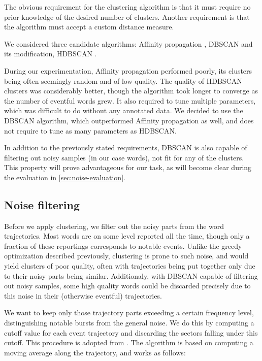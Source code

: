 The obvious requirement for the clustering algorithm is that it must require no prior knowledge of the desired number of clusters. Another requirement is that the algorithm must accept a custom distance measure.

We considered three candidate algorithms: Affinity propagation \citep{affinity-propagation}, DBSCAN \citep{dbscan} and its modification, HDBSCAN \citep{hdbscan}.

During our experimentation, Affinity propagation performed poorly, its clusters being often seemingly random and of low quality. The quality of HDBSCAN clusters was considerably better, though the algorithm took longer to converge as the number of eventful words grew. It also required to tune multiple parameters, which was difficult to do without any annotated data. We decided to use the DBSCAN algorithm, which outperformed Affinity propagation as well, and does not require to tune as many parameters as HDBSCAN.

In addition to the previously stated requirements, DBSCAN is also capable of filtering out noisy samples (in our case words), not fit for any of the clusters. This property will prove advantageous for our task, as will become clear during the evaluation in \autoref{sec:noise-evaluation}.


\subsection{Noise filtering}
Before we apply clustering, we filter out the noisy parts from the word trajectories. Most words are on some level reported all the time, though only a fraction of these reportings corresponds to notable events. Unlike the greedy optimization described previously, clustering is prone to such noise, and would yield clusters of poor quality, often with trajectories being put together only due to their noisy parts being similar. Additionaly, with DBSCAN capable of filtering out noisy samples, some high quality words could be discarded precisely due to this noise in their (otherwise eventful) trajectories.

We want to keep only those trajectory parts exceeding a certain frequency level, distinguishing notable bursts from the general noise. We do this by computing a cutoff value for each event trajectory and discarding the sectors falling under this cutoff. This procedure is adopted from \cite{online-search-queries}. The algorithm is based on computing a moving average along the trajectory, and works as follows:

